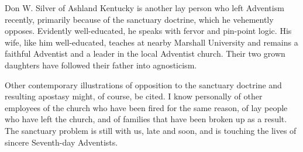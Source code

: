 Don W. Silver of Ashland Kentucky is another lay person who left Adventism
recently, primarily because of the sanctuary doctrine, which he vehemently
opposes. Evidently well-educated, he speaks with fervor and pin-point logic.
His wife, like him well-educated, teaches at nearby Marshall University and
remains a faithful Adventist and a leader in the local Adventist church.
Their two grown daughters have followed their father into
agnosticism.

Other contemporary illustrations of opposition to the sanctuary doctrine and
resulting apostasy might, of course, be cited. I know personally of other
employees of the church who have been fired for the same reason, of lay
people who have left the church, and of families that have been broken up as
a result. The sanctuary problem is still with us, late and soon, and is
touching the lives of sincere Seventh-day Adventists. 
